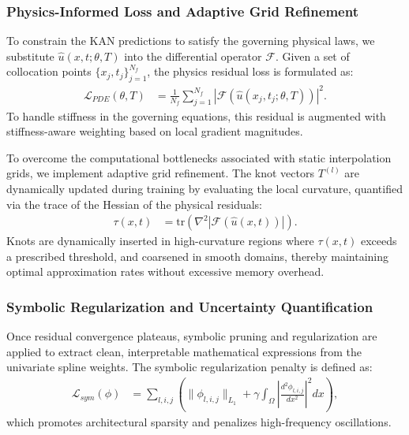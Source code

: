 \documentclass[10pt,twocolumn]{article}
\begin{document}
\subsubsection{Physics-Informed Loss and Adaptive Grid Refinement}
To constrain the KAN predictions to satisfy the governing physical laws, we substitute $\hat{u}(x, t; \theta, T)$ into the differential operator $\mathcal{F}$. Given a set of collocation points $\{x_j, t_j\}_{j=1}^{N_f}$, the physics residual loss is formulated as:
\begin{equation}
\begin{aligned}
\mathcal{L}_{PDE}(\theta, T) &= \frac{1}{N_f} \sum_{j=1}^{N_f} \left| \mathcal{F}\left(\hat{u}(x_j, t_j; \theta, T)\right) \right|^2.
\end{aligned}
\end{equation}
To handle stiffness in the governing equations, this residual is augmented with stiffness-aware weighting based on local gradient magnitudes. 

To overcome the computational bottlenecks associated with static interpolation grids, we implement adaptive grid refinement. The knot vectors $T^{(l)}$ are dynamically updated during training by evaluating the local curvature, quantified via the trace of the Hessian of the physical residuals:
\begin{equation}
\begin{aligned}
\tau(x, t) &= \text{tr}\left( \nabla^2 \left| \mathcal{F}\left(\hat{u}(x, t)\right) \right| \right).
\end{aligned}
\end{equation}
Knots are dynamically inserted in high-curvature regions where $\tau(x,t)$ exceeds a prescribed threshold, and coarsened in smooth domains, thereby maintaining optimal approximation rates without excessive memory overhead.

\subsubsection{Symbolic Regularization and Uncertainty Quantification}
Once residual convergence plateaus, symbolic pruning and regularization are applied to extract clean, interpretable mathematical expressions from the univariate spline weights. The symbolic regularization penalty is defined as:
\begin{equation}
\begin{aligned}
\mathcal{L}_{sym}(\phi) &= \sum_{l,i,j} \left( \|\phi_{l,i,j}\|_{L_1} + \gamma \int_{\Omega} \left| \frac{d^2 \phi_{l,i,j}}{dx^2} \right|^2 dx \right),
\end{aligned}
\end{equation}
which promotes architectural sparsity and penalizes high-frequency oscillations.
\end{document}
